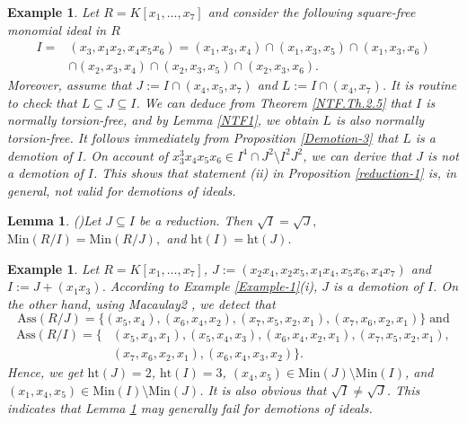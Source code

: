 \documentclass[11pt]{amsart}
\newtheorem{lemma}[theorem]{Lemma}
\newtheorem{example}[theorem]{Example}
\begin{document}
\begin{example}\label{Example-3}
\em{
Let $R=K[x_1, \ldots, x_7]$ and consider the following square-free monomial ideal in $R$
\begin{align*}
I=&(x_3,x_1x_2,x_4x_5x_6)= (x_1,x_3,x_4) \cap (x_1,x_3,x_5) \cap(x_1,x_3,x_6)\\
& \cap (x_2,x_3,x_4)  \cap (x_2,x_3,x_5)  \cap(x_2,x_3,x_6).
\end{align*}
Moreover, assume  that $J:=I\cap (x_4,x_5,x_7)$  and  $L:=I\cap (x_4,x_7)$. It is routine to check that $L\subseteq J \subseteq I$.  We can deduce  from 
 Theorem  \ref{NTF.Th.2.5} that  $I$ is normally torsion-free, and by Lemma \ref{NTF1}, we obtain  $L$ is also   normally torsion-free.
  It follows immediately from Proposition \ref{Demotion-3} that 
 $L$ is  a demotion of $I$. On account of $x_3^3x_4x_5x_6 \in I^4\cap J^2 \setminus I^2J^2$, we can derive that  $J$ is not  a demotion of $I$. 
This shows that statement (ii) in Proposition \ref{reduction-1} is, in general, not valid for demotions of ideals.   
}
\end{example}



\begin{lemma}(\cite[Lemma 8.1.10]{HS})\label{reduction-2}
Let $J \subseteq I$ be a reduction. Then $\sqrt{I} = \sqrt{J},$ $\mathrm{Min}(R/I) = \mathrm{Min}(R/J),$ and $\mathrm{ht}(I) = \mathrm{ht}(J).$
\end{lemma}


\begin{example}\label{Example-4}
\em{
Let $R=K[x_1, \ldots, x_7]$, $J:=(x_2x_4, x_2x_5, x_1x_4, x_5x_6, x_4x_7)$ and $I:=J+(x_1x_3)$.  
According to Example \ref{Example-1}(i),  $J$ is  a demotion of $I$. On the other hand, using  \textit{Macaulay2} \cite{GS}, we detect that
$$\mathrm{Ass}(R/J)=\{(x_5,x_4), (x_6,x_4,x_2), (x_7,x_5,x_2,x_1), (x_7,x_6,x_2,x_1)\} \; \text{and}$$
\begin{align*}
\mathrm{Ass}(R/I)=\{&(x_5,x_4,x_1), (x_5,x_4,x_3), (x_6,x_4,x_2,x_1), (x_7,x_5,x_2,x_1),\\
& (x_7,x_6,x_2,x_1), (x_6,x_4,x_3,x_2)\}.
\end{align*}
Hence, we get  $\mathrm{ht}(J)=2$,  $\mathrm{ht}(I) = 3$, $(x_4,x_5) \in  \mathrm{Min}(J)\setminus \mathrm{Min}(I)$, and  
 $(x_1, x_4, x_5) \in \mathrm{Min}(I)\setminus \mathrm{Min}(J)$. It is also obvious that  $\sqrt{I} \neq  \sqrt{J}$. 
This indicates that Lemma  \ref{reduction-2}  may generally fail for demotions of ideals.
 }
 \end{example}
 
\end{document}
